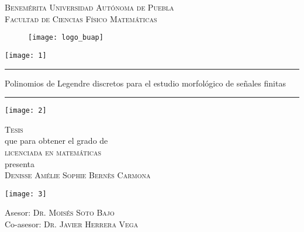 

\begin{center}
{\Large{
\textsc{Benemérita Universidad Autónoma de Puebla}
}} \\
\vspace{0.5cm}
{\Large{
\textsc{Facultad de Ciencias Físico Matemáticas}
}}
\end{center}


\begin{figure}[H]
	\centering
	\texttt{[image: logo\_buap]} 
\end{figure}	

\begin{marginfigure}
\texttt{[image: 1]} 
\end{marginfigure}



\hrule
\vspace{0.5cm}
\begin{center}
{\Large {Polinomios de Legendre discretos
para el estudio morfológico de señales finitas}}
\end{center}
\vspace{0.5cm}
\hrule






\begin{marginfigure}
\texttt{[image: 2]} 
\end{marginfigure}




\vspace{4cm}

\noindent
\textsc{Tesis} \\
que para obtener el grado de \\
\textsc{licenciada en matemáticas} \\
presenta \\
\textsc{Denisse Amélie Sophie Bernès Carmona}


\begin{marginfigure}
\texttt{[image: 3]} 
\end{marginfigure}


\vspace{2cm}

\noindent
Asesor: \textsc{Dr. Moisés Soto Bajo} \\
Co-asesor: \textsc{Dr. Javier Herrera Vega} 




